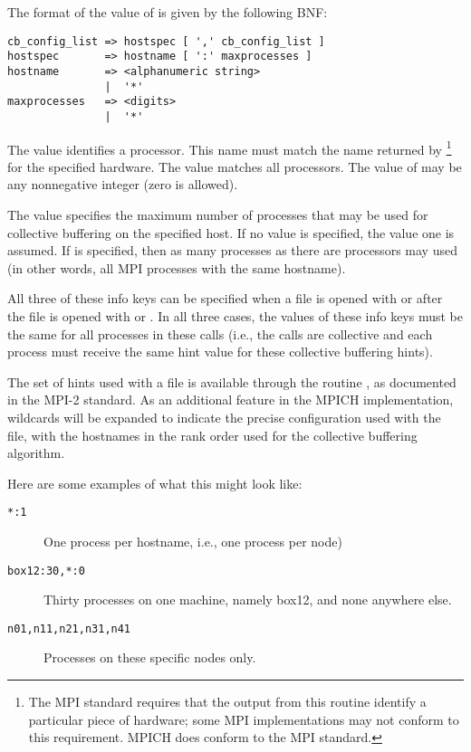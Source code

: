 The format of the value of  is given by the following BNF:
\begin{verbatim}
cb_config_list => hostspec [ ',' cb_config_list ]
hostspec       => hostname [ ':' maxprocesses ]
hostname       => <alphanumeric string>
               |  '*'
maxprocesses   => <digits>
               |  '*'
\end{verbatim}
The value  identifies a processor.  This name must match the
name returned by \footnote{The MPI standard
  requires that the output from this routine identify a particular piece of
  hardware; some MPI implementations may not conform to this requirement.
  MPICH does conform to the MPI standard.} for the specified hardware.
The value \code{*} matches all processors.  The value of 
may be any nonnegative integer (zero is allowed).

The value  specifies the maximum number of processes that
may be used for collective buffering on the specified host.
If no value is specified, the value one is assumed.  If \code{*} is specified,
then as many processes as there are processors may used (in other words, all
MPI processes with the same hostname).

All three of these info keys can be specified when a file is opened with
 or after the file is opened with 
or .  In all three cases, the values of these info
keys must be the same for all processes in these calls (i.e., the calls are
collective and each process must receive the same hint value for these
collective buffering hints).

The set of hints used with a file is available through the routine
, as documented in the MPI-2 standard.  As an
additional feature in the MPICH implementation, wildcards will be expanded to
indicate the precise configuration used with the file, with the hostnames in
the rank order used for the collective buffering algorithm.


Here are some examples of what this might look like:

\begin{description}
\item[\texttt{*:1}]One process per hostname, i.e., one process per node)
\item[\texttt{box12:30,*:0}] Thirty processes on one machine, namely box12,
  and none anywhere else.
\item[\texttt{n01,n11,n21,n31,n41}]Processes on these specific nodes only.
\end{description}

